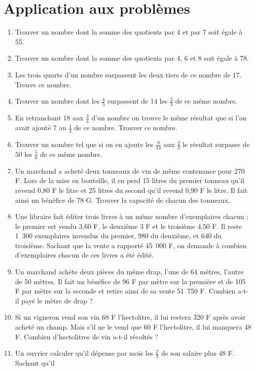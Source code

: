 \documentclass[12 pt]{report}
\theoremstyle{plain}
\newcounter{n}
\begin{document}
 \chapter{Application aux problèmes}
 \begin{enumerate}
 \item Trouver un nombre dont la somme des quotients par 
 4 et par 7 soit égale à 55. 
 \item Trouver un nombre dont la somme des quotients par 4, 6 et 8 soit égale à 78.
 \item Les trois quarts d'un nombre surpassent les deux tiers de ce nombre de 17. Trouve ce nombre.
 \item Trouver un nombre dont les $\frac45$ surpassent de 14 les $\frac23$ de ce même nombre. 
 \item En retranchant 18 aux $\frac34$ d'un nombre on trouve le même résultat que si l'on avait ajouté 7 au 
 $\frac13$ de ce nombre. Trouver ce nombre.
 \item Trouver un nombre tel que si on en ajoute les $\frac9{14}$ aux $\frac23$ le résultat surpasse de $50$ les $\frac56$ de ce même nombre.
\item Un marchand a acheté deux tonneaux de vin de même 
 contenance pour 270 F. Lors de la mise en bouteille, il 
 en perd 15 litres du premier tonneau qu'il revend 0,80 F 
 le litre et 25 litres du second qu'il revend 0,90 F le 
 litre. Il fait ainsi un bénéfice de 78 G. Trouver la 
 capacité de chacun des tonneaux. 
\item Une libraire fait éditer trois livres à un même 
 nombre d'exemplaires chacun ; le premier est vendu 3,60 
 F, le deuxième 3 F et le troisième 4,50 F. Il reste 1~300 
 exemplaires invendus du premier, 980 du deuxième, et 640 
 du troisième. Sachant que la vente a rapporté 45~000 F, 
 on demande à combien d'exemplaires chacun de ces livres a 
 été édité.
 \item Un marchand achète deux pièces du même drap, l'une 
 de 64 mètres, l'autre de 50 mètres. Il fait un bénéfice 
 de 96 F par mètre sur la première et de 105 F par mètre 
 sur la seconde et retire ainsi de sa vente 51~750 F. 
 Combien a-t-il payé le mètre de drap ? 
 \item Si un vigneron vend son vin 68 F l'hectolitre, il 
 lui restera 320 F après avoir acheté un champ. Mais s'il 
 ne le vend que 60 F l'hectolitre, il lui manquera 48 F. 
 Combien d'hectolitres de vin a-t-il récoltés ? 
 \item Un ouvrier calculer qu'il dépense par mois les 
 $\frac23$ de son salaire plus 48 F. Sachant qu'il 

\end{enumerate}
\end{document}
